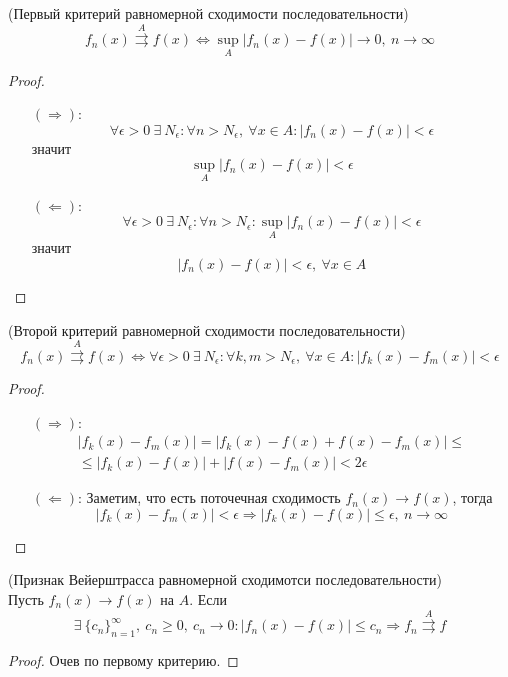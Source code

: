 \begin{theorem} (Первый критерий равномерной сходимости последовательности)\\
    \[f_n(x) \overset{A}{\rightrightarrows} f(x) \Leftrightarrow \sup\limits_A|f_n(x)-f(x)|\to 0,\ n\to \infty\]
\end{theorem}
\begin{proof}\tab
    \begin{itemize}
        \item [$(\Rightarrow)$:] 
        \[\forall \epsilon>0\ \exists\ N_{\epsilon}: \forall n>N_{\epsilon},\ \forall x\in A: |f_n(x)-f(x)|<\epsilon\]
        значит
        \[\sup\limits_A|f_n(x)-f(x)|<\epsilon\]
        \item[$(\Leftarrow)$:]
        \[\forall \epsilon>0\ \exists\ N_{\epsilon}: \forall n>N_{\epsilon}: \sup\limits_A|f_n(x)-f(x)|<\epsilon\]
        значит
        \[|f_n(x)-f(x)|<\epsilon,\ \forall x\in A\]
    \end{itemize}
\end{proof}
\begin{theorem} (Второй критерий равномерной сходимости последовательности)\\
    \[f_n(x)\overset{A}{\rightrightarrows} f(x) \Leftrightarrow \forall \epsilon>0\ \exists\ N_{\epsilon}: \forall k,m>N_{\epsilon},\ \forall x\in A: |f_k(x)-f_m(x)|<\epsilon\]
\end{theorem}
\begin{proof}\tab
    \begin{itemize}
        \item[$(\Rightarrow)$:] 
        \begin{multline*}
            |f_k(x)-f_m(x)|=|f_k(x)-f(x)+f(x)-f_m(x)|\leq\\
            \leq |f_k(x)-f(x)|+|f(x)-f_m(x)|<2\epsilon
        \end{multline*}
        \item[$(\Leftarrow)$:]
        Заметим, что есть поточечная сходимость $f_n(x)\to f(x)$, тогда
        \[|f_k(x)-f_m(x)|<\epsilon \Rightarrow |f_k(x)-f(x)|\leq \epsilon,\ n\to \infty\]
    \end{itemize}    
\end{proof}
\begin{theorem} (Признак Вейерштрасса равномерной сходимотси последовательности)\\
    Пусть $f_n(x)\to f(x)$ на $A$. Если 
    \[\exists\ \{c_n\}_{n=1}^{\infty},\ c_n\geq 0,\ c_n\to 0: |f_n(x)-f(x)|\leq c_n \Rightarrow f_n\overset{A}{\rightrightarrows} f\]
\end{theorem}
\begin{proof}
    Очев по первому критерию.
\end{proof}